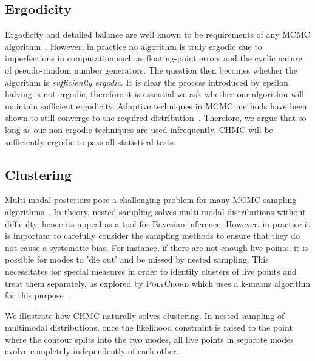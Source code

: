 \documentclass[11pt]{article}
\begin{document}
    \subsection{Ergodicity}
    Ergodicity and detailed balance are well known to be requirements of any MCMC algorithm~\cite{Metropolis_OG}.
    However, in practice no algorithm is truly ergodic due to imperfections in computation such as floating-point
    errors and the cyclic nature of pseudo-random number generators.
    The question then becomes whether the algorithm is \emph{sufficiently ergodic}.
    It is clear the process introduced by epsilon halving is not ergodic, therefore it is essential we ask
    whether our algorithm will maintain sufficient ergodicity.
    Adaptive techniques in MCMC methods have been shown to still converge to the required
    distribution~\cite{MCMC_Ergodicity}.
    Therefore, we argue that so long as our non-ergodic techniques are used infrequently, CHMC will be sufficiently
    ergodic to pass all statistical tests.

    \subsection{Clustering}

    Multi-modal posteriors pose a challenging problem for many MCMC sampling algorithms~\cite{mangoubi2018_HMC_Multimodal}.
    In theory, nested sampling solves multi-modal distributions without difficulty, hence its appeal as a tool for
    Bayesian inference.
    However, in practice it is important to carefully consider the sampling methods to ensure that they do not
    cause a systematic bias.
    For instance, if there are not enough live points, it is possible for modes to 'die out' and be missed by nested
    sampling.
    This necessitates for special measures in order to identify clusters of live points and treat them separately,
    as explored by \textsc{PolyChord} which uses a k-means algorithm for this purpose~\cite{Handley_polychord}.

    We illustrate how CHMC naturally solves clustering.
    In nested sampling of multimodal distributions, once the likelihood constraint is raised to the point where the
    contour splits into the two modes, all live points in separate modes evolve completely independently of each other.
\end{document}
